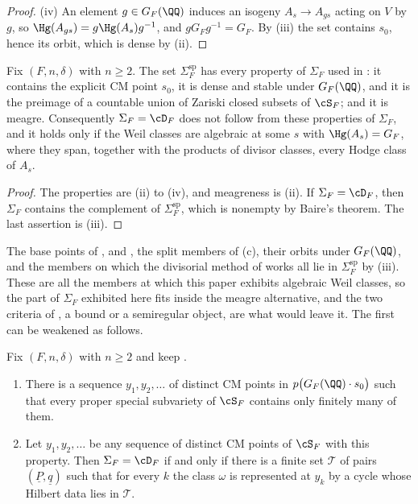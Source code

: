 \begin{proof}
(iv) An element $g\in G_{F}(\QQ)$ induces an isogeny $A_{s}\to A_{gs}$ acting
on $V$ by $g$, so $\Hg(A_{gs})=g\Hg(A_{s})g^{-1}$, and $gG_{F}g^{-1}=G_{F}$.
By (iii) the set contains $s_{0}$, hence its orbit, which is dense by
(ii).
\end{proof}

\begin{corollary}\label{cor:speciallocus}
Fix $(F,n,\delta)$ with $n\ge2$. The set $\Sigma^{\mathrm{sp}}_{F}$ has every
property of $\Sigma_{F}$ used in : it contains the explicit CM
point $s_{0}$, it is dense and stable under $G_{F}(\QQ)$, and it is the
preimage of a countable union of Zariski closed subsets of $\cS_{F}$; and it
is meagre. Consequently $\Sigma_{F}=\cD_{F}$ does not follow from these
properties of $\Sigma_{F}$, and it holds only if the Weil classes are
algebraic at some $s$ with $\Hg(A_{s})=G_{F}$, where they span, together with
the products of divisor classes, every Hodge class of $A_{s}$.
\end{corollary}

\begin{proof}
The properties are (ii) to (iv), and meagreness is
(ii). If $\Sigma_{F}=\cD_{F}$, then $\Sigma_{F}$ contains the complement of
$\Sigma^{\mathrm{sp}}_{F}$, which is nonempty by Baire's theorem. The last
assertion is (iii).
\end{proof}

The base points of ,  and
, the split members of (c), their orbits
under $G_{F}(\QQ)$, and the members on which the divisorial method of
 works all lie in $\Sigma^{\mathrm{sp}}_{F}$ by
(iii). These are all the members at which this paper
exhibits algebraic Weil classes, so the part of $\Sigma_{F}$ exhibited here
fits inside the meagre alternative, and the two criteria of , a
bound or a semiregular object, are what would leave it. The first can be
weakened as follows.

\begin{theorem}\label{thm:escape}
Fix $(F,n,\delta)$ with $n\ge2$ and keep .
\begin{enumerate}[label=\textup{(\roman*)},leftmargin=2.6em,itemsep=2pt]
\item There is a sequence $y_{1},y_{2},\dots$ of distinct CM points in
  $p\bigl(G_{F}(\QQ)\cdot s_{0}\bigr)$ such that every proper special
  subvariety of $\cS_{F}$ contains only finitely many of them.
\item Let $y_{1},y_{2},\dots$ be any sequence of distinct CM points of
  $\cS_{F}$ with this property. Then $\Sigma_{F}=\cD_{F}$ if and only if there
  is a finite set $\mathcal{T}$ of pairs $(\underline{P},\underline{q})$ such
  that for every $k$ the class $\omega$ is represented at $y_{k}$ by a cycle
  whose Hilbert data lies in $\mathcal{T}$.
\end{enumerate}
\end{theorem}

